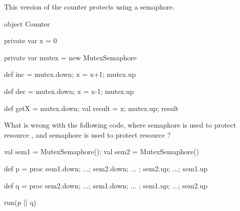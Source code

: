 
\begin{slide}

This version of the counter protects  using a semaphore.
%
\begin{scala}
object Counter{
  private var x = 0
  
  private var mutex = new MutexSemaphore
    
  def inc = { mutex.down; x = x+1; mutex.up }

  def dec = { mutex.down; x = x-1; mutex.up }

  def getX = { mutex.down; val result = x; mutex.up; result }
}
\end{scala}
%
\end{slide}


\begin{slide}

What is wrong with the following code, where semaphore  is used to
protect resource , and semaphore  is used to protect
resource ?
%
\begin{scala}
val sem1 = MutexSemaphore(); val sem2 = MutexSemaphore()

def p = proc{
  sem1.down; ...; sem2.down; ... ; sem2.up; ...; sem1.up
}

def q = proc{
  sem2.down; ...; sem1.down; ... ; sem1.up; ...; sem2.up
}

run(p || q)
\end{scala}
\end{slide}
